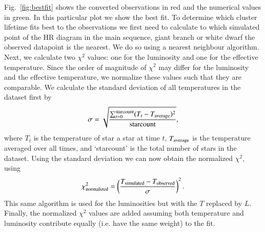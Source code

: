 \documentclass{aa}
\begin{document}
Fig.~\ref{fig:bestfit} shows the converted observations in red and the numerical values in green. In this particular plot we show the best fit. To determine which cluster lifetime fits best to the observations we first need to calculate to which simulated point of the HR diagram in the main sequence, giant branch or white dwarf the observed datapoint is the nearest. We do so using a nearest neighbour algorithm. Next, we calculate two $\chi^2$ values: one for the luminosity and one for the effective temperature. Since the order of magnitude of $\chi^2$ may differ for the luminosity and the effective temperature, we normalize these values such that they are comparable. We calculate the standard deviation of all temperatures in the dataset first by
\begin{eqnarray}
    \sigma = \sqrt{\frac{\sum_{t=0}^{\text{starcount}} (T_t - T_{\rm average})^2}{\text{starcount}}}, \label{eq:stdev} 
\end{eqnarray}where $T_t$ is the temperature of star a star at time $t$, $T_{\rm average}$ is the temperature averaged over all times, and `starcount' is the total number of stars in the dataset. Using the standard deviation we can now obtain the normalized $\chi^2$, using
\begin{eqnarray}
    \chi^2_{\rm normalized} = \left( \frac{T_{\rm simulated} - T_{\rm observed}}{\sigma} \right)^2.
\end{eqnarray}
This same algorithm is used for the luminosities but with the $T$ replaced by $L$. Finally, the normalized $\chi^2$ values are added assuming both temperature and luminosity contribute equally (i.e. have the same weight) to the fit.
\end{document}
